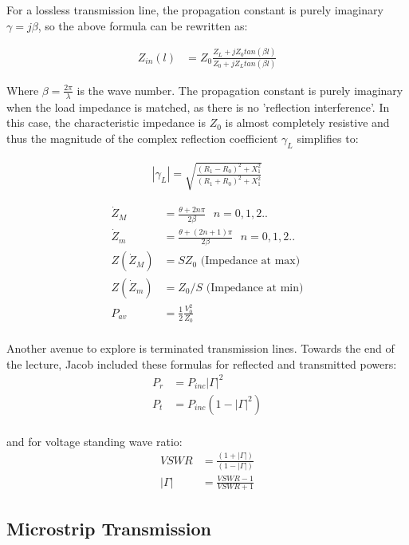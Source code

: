 \documentclass{book}
\begin{document}
For a lossless transmission line, the propagation constant is purely imaginary $\gamma = j\beta$, so the above formula can be rewritten as:

\begin{align*}
	Z_{in}(l) &= Z_0 \frac{Z_L + j Z_0 tan(\beta l)}{Z_0 + j Z_L tan(\beta l)}
\end{align*}

Where $\beta = \frac{2 \pi}{\lambda}$ is the wave number. The propagation constant is purely imaginary when the load impedance is matched, as there is no 'reflection interference'. In this case, the characteristic impedance is $Z_0$ is almost completely resistive and thus the magnitude of the complex reflection coefficient  $\gamma_L$ simplifies to:

\begin{align*}
	|\gamma_L| = \sqrt{\frac{(R_1 - R_0)^2+ X_1 ^2}{(R_1 + R_0)^2 + X_1 ^2}}
\end{align*}

\begin{align*}
	\dot{Z}_M &= \frac{\theta + 2n\pi}{2 \beta} \text{  } n=0,1,2.. \\
	\dot{Z}_m &= \frac{\theta +(2n+1)\pi}{2 \beta} \text{  } n=0,1,2.. \\
	Z(\dot{Z}_M) &= S Z_0 \text{ (Impedance at max)} \\
	Z(\dot{Z}_m) &= Z_0 / S \text{ (Impedance at min)} \\
	P_{av} &= \frac{1}{2} \frac{V_0^2}{Z_0} \\
\end{align*}

Another avenue to explore is terminated transmission lines. Towards the end of the lecture, Jacob included these formulas for reflected and transmitted powers:
\begin{align*}
	P_r &= P_{inc} |\Gamma|^2 \\
	P_t &= P_{inc} (1- |\Gamma|^2) \\
\end{align*}

and for voltage standing wave ratio:
\begin{align*}
	VSWR &= \frac{(1 + |\Gamma|)}{(1 - |\Gamma|)} \\
	|\Gamma| &= \frac{VSWR - 1}{VSWR + 1}
\end{align*}

\subsection{Microstrip Transmission}
\end{document}
